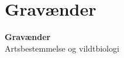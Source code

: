 \section{Gravænder}

\begin{frame}
  \vspace{3em}
  \begin{center}
    {\LARGE \textbf{Gravænder}}
    \vspace{2em}
    \\ Artsbestemmelse og vildtbiologi
\par
{\normalsize }
\vspace{1em}
\par
  \end{center}
\end{frame}



